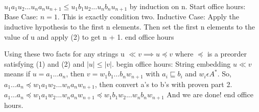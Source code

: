 \documentclass[12pt]{article}
\begin{document}
\medskip

$u_1a_1u_2...u_na_nu_{n+1} \le u_1b_1u_2...u_nb_nu_{n+1}$ by induction on n.
Start office hours: Base Case: $n=1$. This is exactly condition two. Inductive Case: Apply the inductive hypothesis to the 
first n elements. Then set the first n elements to the value of u and apply (2) to get n + 1. end office hours
\medskip

Using these two facts for any strings u $\ll v \implies u \preceq v$ where $\preceq$ is a preorder satisfying (1) and 
(2) and $|u| \le |v|$. begin office hours: String embedding $u \ll v$ means if $u=a_1 ...a_n$, then $v=w_1 b_1 ... b_n w_{n+1}$
with $a_i \sqsubseteq b_i$ and $w_i \epsilon A^{\ast}$. So, $a_1 ... a_n  \preceq w_1 a_1 w_2 ... w_n a_n w_{n+1}$, then convert
a's to b's with proven part 2. $a_1 ... a_n  \preceq w_1 a_1 w_2 ... w_n a_n w_{n+1} \preceq w_1 b_1 w_2 ... w_n b_n w_{n+1}$
And we are done! end office hours.
\end{document}
